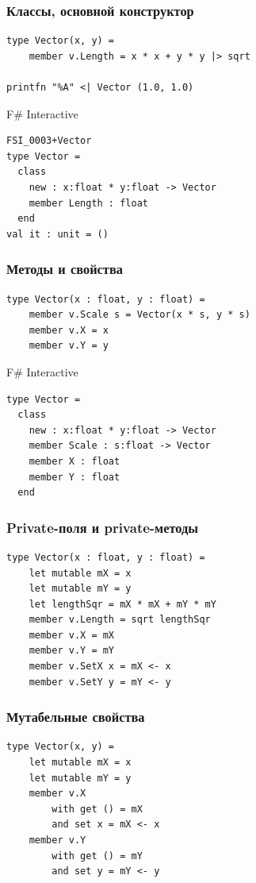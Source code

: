 \documentclass{../../slides-style}
\begin{document}
    \begin{frame}[fragile]
        \frametitle{Классы, основной конструктор}
        \begin{verbatim}
type Vector(x, y) = 
    member v.Length = x * x + y * y |> sqrt

printfn "%A" <| Vector (1.0, 1.0)
        \end{verbatim}

        \begin{alertblock}{F\# Interactive}
            \begin{verbatim}
FSI_0003+Vector
type Vector =
  class
    new : x:float * y:float -> Vector
    member Length : float
  end
val it : unit = ()
            \end{verbatim}
        \end{alertblock}
    \end{frame}

    \begin{frame}[fragile]
        \frametitle{Методы и свойства}
        \begin{verbatim}
type Vector(x : float, y : float) = 
    member v.Scale s = Vector(x * s, y * s)
    member v.X = x
    member v.Y = y
        \end{verbatim}

        \begin{alertblock}{F\# Interactive}
            \begin{verbatim}
type Vector =
  class
    new : x:float * y:float -> Vector
    member Scale : s:float -> Vector
    member X : float
    member Y : float
  end
            \end{verbatim}
        \end{alertblock}
    \end{frame}

    \begin{frame}[fragile]
        \frametitle{Private-поля и private-методы}
        \begin{verbatim}
type Vector(x : float, y : float) = 
    let mutable mX = x
    let mutable mY = y
    let lengthSqr = mX * mX + mY * mY
    member v.Length = sqrt lengthSqr
    member v.X = mX
    member v.Y = mY
    member v.SetX x = mX <- x
    member v.SetY y = mY <- y
        \end{verbatim}
    \end{frame}

    \begin{frame}[fragile]
        \frametitle{Мутабельные свойства}
        \begin{verbatim}
type Vector(x, y) = 
    let mutable mX = x
    let mutable mY = y
    member v.X 
        with get () = mX
        and set x = mX <- x
    member v.Y
        with get () = mY
        and set y = mY <- y
        \end{verbatim}
    \end{frame}
\end{document}
